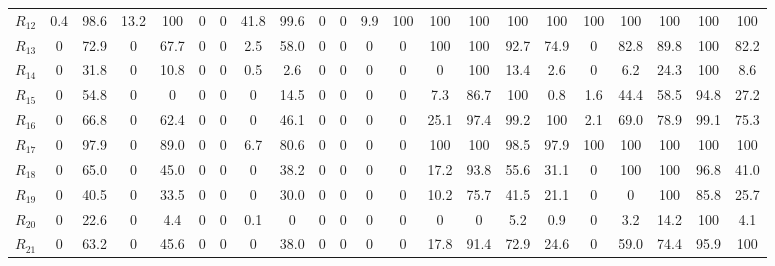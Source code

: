 \begin{table}[h!]
\begin{tabularx}{\textwidth}{X|CCCCCCCCCCCCCCCCCCCCC}
$R_{12}$ & 0.4 & 98.6 & 13.2 & 100 & 0 & 0 & 41.8 & 99.6 & 0 & 0 & 9.9 & 100 & 100 & 100 & 100 & 100 & 100 & 100 & 100 & 100 & 100 \\
$R_{13}$ & 0 & 72.9 & 0 & 67.7 & 0 & 0 & 2.5 & 58.0 & 0 & 0 & 0 & 0 & 100 & 100 & 92.7 & 74.9 & 0 & 82.8 & 89.8 & 100 & 82.2 \\
$R_{14}$ & 0 & 31.8 & 0 & 10.8 & 0 & 0 & 0.5 & 2.6 & 0 & 0 & 0 & 0 & 0 & 100 & 13.4 & 2.6 & 0 & 6.2 & 24.3 & 100 & 8.6 \\
$R_{15}$ & 0 & 54.8 & 0 & 0 & 0 & 0 & 0 & 14.5 & 0 & 0 & 0 & 0 & 7.3 & 86.7 & 100 & 0.8 & 1.6 & 44.4 & 58.5 & 94.8 & 27.2 \\
$R_{16}$ & 0 & 66.8 & 0 & 62.4 & 0 & 0 & 0 & 46.1 & 0 & 0 & 0 & 0 & 25.1 & 97.4 & 99.2 & 100 & 2.1 & 69.0 & 78.9 & 99.1 & 75.3 \\
$R_{17}$ & 0 & 97.9 & 0 & 89.0 & 0 & 0 & 6.7 & 80.6 & 0 & 0 & 0 & 0 & 100 & 100 & 98.5 & 97.9 & 100 & 100 & 100 & 100 & 100 \\
$R_{18}$ & 0 & 65.0 & 0 & 45.0 & 0 & 0 & 0 & 38.2 & 0 & 0 & 0 & 0 & 17.2 & 93.8 & 55.6 & 31.1 & 0 & 100 & 100 & 96.8 & 41.0 \\
$R_{19}$ & 0 & 40.5 & 0 & 33.5 & 0 & 0 & 0 & 30.0 & 0 & 0 & 0 & 0 & 10.2 & 75.7 & 41.5 & 21.1 & 0 & 0 & 100 & 85.8 & 25.7 \\
$R_{20}$ & 0 & 22.6 & 0 & 4.4 & 0 & 0 & 0.1 & 0 & 0 & 0 & 0 & 0 & 0 & 0 & 5.2 & 0.9 & 0 & 3.2 & 14.2 & 100 & 4.1 \\
$R_{21}$ & 0 & 63.2 & 0 & 45.6 & 0 & 0 & 0 & 38.0 & 0 & 0 & 0 & 0 & 17.8 & 91.4 & 72.9 & 24.6 & 0 & 59.0 & 74.4 & 95.9 & 100 \\
\bottomrule
\end{tabularx}
\end{table}
